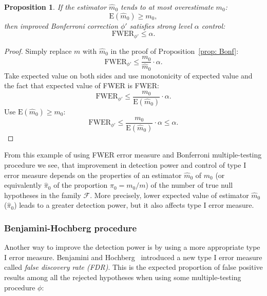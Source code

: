 \documentclass[10pt]{article}
\newtheorem{proposition}[theorem]{Proposition}
\begin{document}
\begin{proposition}
	If the estimator $\widehat{m}_0$ tends to at most overestimate $m_{0}$:
	\begin{equation}
	\text{E}(\widehat{m}_{0}) \geq m_{0},
	\end{equation}
	then improved Bonferroni correction $\phi'$ satisfies strong level $\alpha$ control:
	\begin{equation}
	\text{FWER}_{\phi'} \leq \alpha.
	\end{equation}
\end{proposition}
\begin{proof}
	Simply replace $m$ with $\widehat{m}_{0}$ in the proof of Proposition~\ref{prop: Bonf}:
	\begin{equation}
	\text{FWER}_{\phi'} \leq \frac{m_{0}}{\widehat{m}_{0}} \cdot \alpha.
	\end{equation}
	Take expected value on both sides and use monotonicity of expected value and the fact that expected value of FWER is FWER:
	\begin{equation}
	\text{FWER}_{\phi'} \leq \frac{m_{0}}{ \text{E}(\widehat{m}_{0}) } \cdot \alpha.
	\end{equation}
	Use $\text{E}(\widehat{m}_{0}) \geq m_{0}$:
	\begin{equation}
	\text{FWER}_{\phi'} \leq \frac{m_{0}}{ \text{E}(\widehat{m}_{0}) } \cdot \alpha \leq \alpha.
	\end{equation}	
\end{proof}

From this example of using FWER error measure and Bonferroni multiple-testing procedure we see, that improvement in detection power and control of type I error measure depends on the properties of an estimator $\widehat{m}_{0}$ of $m_{0}$ (or equivalently $\widehat{\pi}_{0}$ of the proportion $\pi_{0} = m_{0}/m$) of the number of true null hypotheses in the family $\mathcal{F}$. More precisely, lower expected value of estimator $\widehat{m}_{0}$ ($\widehat{\pi}_{0}$) leads to a greater detection power, but it also affects type I error measure. 


\subsubsection{Benjamini-Hochberg procedure}

Another way to improve the detection power is by using a more appropriate type I error measure. Benjamini and Hochberg~\cite{BH} introduced a new type I error measure called {\it false discovery rate (FDR)}. This is the expected proportion of false positive results among all the rejected hypotheses when using some multiple-testing procedure $\phi$:
\end{document}
